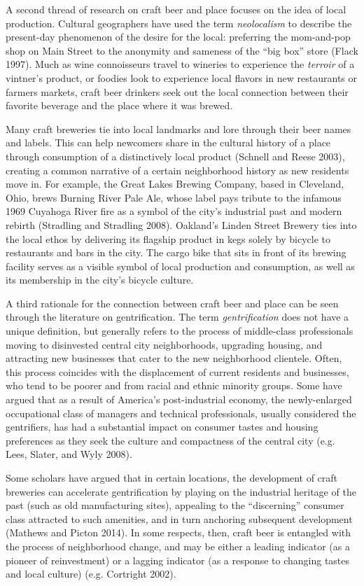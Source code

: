 \documentclass[]{article}
\begin{document}
A second thread of research on craft beer and place focuses on the idea
of local production. Cultural geographers have used the term
\emph{neolocalism} to describe the present-day phenomenon of the desire
for the local: preferring the mom-and-pop shop on Main Street to the
anonymity and sameness of the ``big box'' store (Flack 1997). Much as
wine connoisseurs travel to wineries to experience the \emph{terroir} of
a vintner's product, or foodies look to experience local flavors in new
restaurants or farmers markets, craft beer drinkers seek out the local
connection between their favorite beverage and the place where it was
brewed.

Many craft breweries tie into local landmarks and lore through their
beer names and labels. This can help newcomers share in the cultural
history of a place through consumption of a distinctively local product
(Schnell and Reese 2003), creating a common narrative of a certain
neighborhood history as new residents move in. For example, the Great
Lakes Brewing Company, based in Cleveland, Ohio, brews Burning River
Pale Ale, whose label pays tribute to the infamous 1969 Cuyahoga River
fire as a symbol of the city's industrial past and modern rebirth
(Stradling and Stradling 2008). Oakland's Linden Street Brewery ties
into the local ethos by delivering its flagship product in kegs solely
by bicycle to restaurants and bars in the city. The cargo bike that sits
in front of its brewing facility serves as a visible symbol of local
production and consumption, as well as its membership in the city's
bicycle culture.

A third rationale for the connection between craft beer and place can be
seen through the literature on gentrification. The term
\emph{gentrification} does not have a unique definition, but generally
refers to the process of middle-class professionals moving to
disinvested central city neighborhoods, upgrading housing, and
attracting new businesses that cater to the new neighborhood clientele.
Often, this process coincides with the displacement of current residents
and businesses, who tend to be poorer and from racial and ethnic
minority groups. Some have argued that as a result of America's
post-industrial economy, the newly-enlarged occupational class of
managers and technical professionals, usually considered the
gentrifiers, has had a substantial impact on consumer tastes and housing
preferences as they seek the culture and compactness of the central city
(e.g. Lees, Slater, and Wyly 2008).

Some scholars have argued that in certain locations, the development of
craft breweries can accelerate gentrification by playing on the
industrial heritage of the past (such as old manufacturing sites),
appealing to the ``discerning'' consumer class attracted to such
amenities, and in turn anchoring subsequent development (Mathews and
Picton 2014). \protect\hypertarget{move4227634296}{}{}In some respects,
then, craft beer is entangled with the process of neighborhood change,
and may be either a leading indicator (as a pioneer of reinvestment) or
a lagging indicator (as a response to changing tastes and local culture)
(e.g. Cortright 2002).
\end{document}
